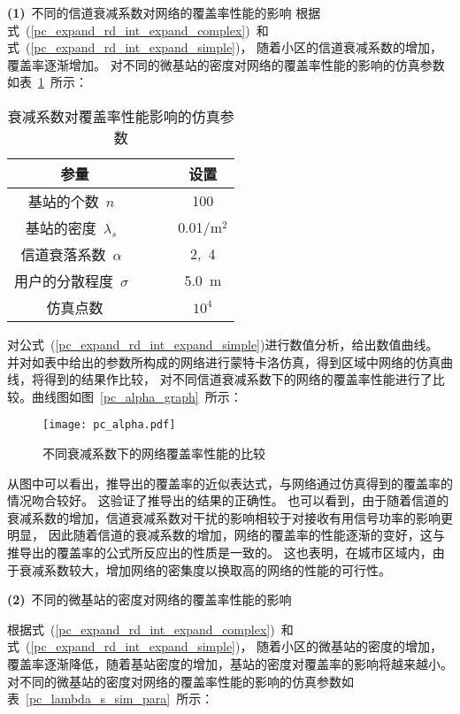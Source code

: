 \textbf{(1)}~不同的信道衰减系数对网络的覆盖率性能的影响
根据式~(\ref{pc_expand_rd_int_expand_complex})~和式~(\ref{pc_expand_rd_int_expand_simple})，
随着小区的信道衰减系数的增加，覆盖率逐渐增加。
对不同的微基站的密度对网络的覆盖率性能的影响的仿真参数如表~\ref{pc_alpha_sim_para}~所示：

\begin{table}[htbp]
\caption{衰减系数对覆盖率性能影响的仿真参数}
\label{pc_alpha_sim_para}
\vspace{0.5em}\centering\wuhao
\begin{tabular}{cccc}
\toprule[1.5pt]
参量 & & & 设置 \\
\midrule[0.5pt]
基站的个数~$n$~ & & &  100\\
基站的密度~$\lambda_s$~ & & &  0.01/${\mathrm{m}^2}$\\
信道衰落系数~$\alpha$~  & & &  2,~4\\
用户的分散程度~$\sigma$~ & & & 5.0~$\mathrm{m}$ \\
仿真点数 & & & $10^{4}$ \\
\bottomrule[1.5pt]
\end{tabular}
\end{table}

对公式~(\ref{pc_expand_rd_int_expand_simple})进行数值分析，给出数值曲线。
并对如表中给出的参数所构成的网络进行蒙特卡洛仿真，得到区域中网络的仿真曲线，将得到的结果作比较，
对不同信道衰减系数下的网络的覆盖率性能进行了比较。曲线图如图~\ref{pc_alpha_graph}~所示：

\begin{figure}[htbp]\label{pc_alpha_graph}
\centering
\texttt{[image: pc\_alpha.pdf]}
\caption{不同衰减系数下的网络覆盖率性能的比较}\vspace{-0.5em}
\label{e_capacity_show}
\end{figure}
从图中可以看出，推导出的覆盖率的近似表达式，与网络通过仿真得到的覆盖率的情况吻合较好。
这验证了推导出的结果的正确性。
也可以看到，由于随着信道的衰减系数的增加，信道衰减系数对干扰的影响相较于对接收有用信号功率的影响更明显，
因此随着信道的衰减系数的增加，网络的覆盖率的性能逐渐的变好，这与推导出的覆盖率的公式所反应出的性质是一致的。
这也表明，在城市区域内，由于衰减系数较大，增加网络的密集度以换取高的网络的性能的可行性。

\textbf{(2)}~不同的微基站的密度对网络的覆盖率性能的影响

根据式~(\ref{pc_expand_rd_int_expand_complex})~和式~(\ref{pc_expand_rd_int_expand_simple})，
随着小区的微基站的密度的增加，覆盖率逐渐降低，随着基站密度的增加，基站的密度对覆盖率的影响将越来越小。
对不同的微基站的密度对网络的覆盖率性能的影响的仿真参数如表~\ref{pc_lambda_s_sim_para}~所示：

